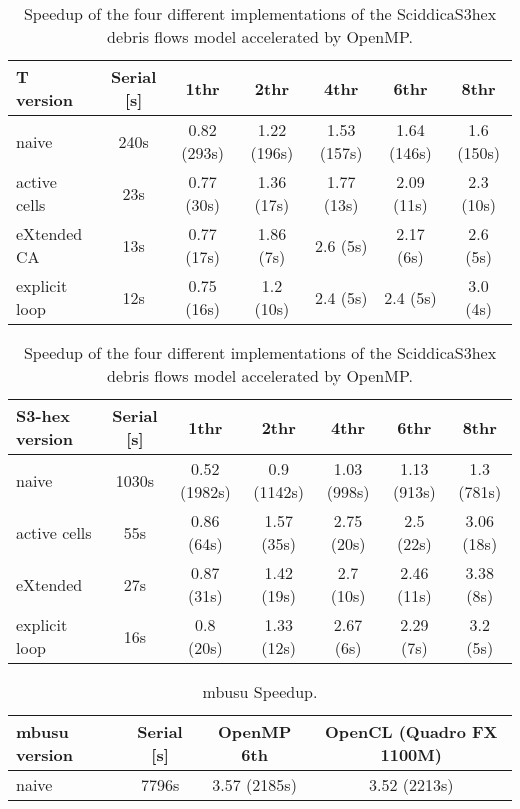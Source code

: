 \begin{table}
  \centering
  \begin{tabular}{l|c|c|c|c|c|c}
    \hline
    T version & Serial [s] & 1thr & 2thr & 4thr & 6thr & 8thr\\
    \hline
    \hline
    naive         & 240s & 0.82 (293s) & 1.22 (196s) & 1.53 (157s) & 1.64 (146s) & 1.6 (150s)\\
    active cells  & 23s  & 0.77 (30s)  & 1.36 (17s)  & 1.77 (13s)  & 2.09 (11s)  & 2.3 (10s)\\
    eXtended CA   & 13s  & 0.77 (17s)  & 1.86 (7s)   & 2.6  (5s)   & 2.17  (6s)  & 2.6 (5s)\\
    explicit loop & 12s  & 0.75 (16s)  & 1.2  (10s)  & 2.4  (5s)   & 2.4  (5s)   & 3.0 (4s)\\
    \hline
  \end{tabular}
  \caption{Speedup of the four different
    implementations of the SciddicaS3hex debris flows model accelerated by OpenMP.}
  \label{tab:speedup}
\end{table} 

\begin{table}
  \centering
  \begin{tabular}{l|c|c|c|c|c|c}
    \hline
    S3-hex version & Serial [s] & 1thr & 2thr & 4thr & 6thr & 8thr\\
    \hline
    \hline
    naive         & 1030s & 0.52 (1982s) & 0.9 (1142s) & 1.03 (998s) & 1.13 (913s) & 1.3  (781s)\\
    active cells  & 55s   & 0.86 (64s)   & 1.57 (35s)  & 2.75 (20s)  & 2.5  (22s)  & 3.06 (18s)\\
    eXtended      & 27s   & 0.87 (31s)   & 1.42 (19s)  & 2.7  (10s)  & 2.46 (11s)  & 3.38 (8s)\\
    explicit loop & 16s   & 0.8  (20s)   & 1.33 (12s)  & 2.67 (6s)  & 2.29  (7s)   & 3.2  (5s)\\
    \hline
  \end{tabular}
  \caption{Speedup of the four different
    implementations of the SciddicaS3hex debris flows model accelerated by OpenMP.}
  \label{tab:speedup}
\end{table} 

\begin{table}
  \centering
  \begin{tabular}{l|c|c|c}
    \hline
    mbusu version & Serial [s] & OpenMP 6th & OpenCL (Quadro FX 1100M)\\
    \hline
    \hline
    naive         & 7796s & 3.57 (2185s) & 3.52 (2213s)\\
    \hline
  \end{tabular}
  \caption{mbusu Speedup.}
  \label{tab:speedup}
\end{table} 

